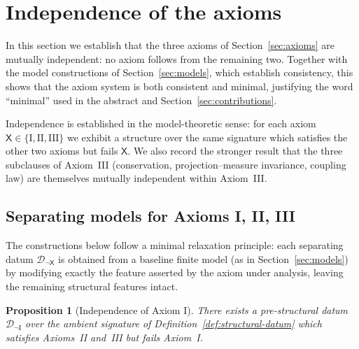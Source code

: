 \documentclass[11pt]{article}
\numberwithin{equation}{section}
\newtheorem{proposition}[theorem]{Proposition}
\theoremstyle{definition}
\begin{document}

\section{Independence of the axioms}\label{sec:independence}

In this section we establish that the three axioms of Section~\ref{sec:axioms} are mutually independent: no axiom follows from the remaining two. Together with the model constructions of Section~\ref{sec:models}, which establish consistency, this shows that the axiom system is both consistent and minimal, justifying the word ``minimal'' used in the abstract and Section~\ref{sec:contributions}.

Independence is established in the model-theoretic sense: for each axiom $\mathsf X\in\{\mathrm{I},\mathrm{II},\mathrm{III}\}$ we exhibit a structure over the same signature which satisfies the other two axioms but fails $\mathsf X$. We also record the stronger result that the three subclauses of Axiom~III (conservation, projection--measure invariance, coupling law) are themselves mutually independent within Axiom~III.

\subsection{Separating models for Axioms I, II, III}

The constructions below follow a minimal relaxation principle: each separating datum $\mathcal D_{\neg \mathsf X}$ is obtained from a baseline finite model (as in Section~\ref{sec:models}) by modifying exactly the feature asserted by the axiom under analysis, leaving the remaining structural features intact.

\begin{proposition}[Independence of Axiom I]\label{prop:indep-I}
There exists a pre-structural datum $\mathcal D_{\neg \mathrm{I}}$ over the ambient signature of Definition~\ref{def:structural-datum} which satisfies Axioms~II and~III but fails Axiom~I.
\end{proposition}
\end{document}
